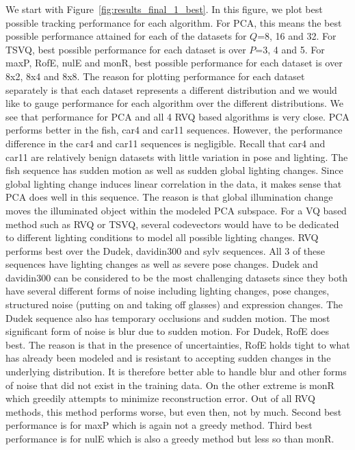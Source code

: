 We start with Figure~\ref{fig:results_final_1_best}.  In this figure, we plot best possible tracking performance for each algorithm.  For PCA, this means the best possible performance attained for each of the datasets for $Q$=8, 16 and 32.  For TSVQ, best possible performance for each dataset is over $P$=3, 4 and 5.  For maxP, RofE, nulE and monR, best possible performance for each dataset is over 8x2, 8x4 and 8x8.  The reason for plotting performance for each dataset separately is that each dataset represents a different distribution and we would like to gauge performance for each algorithm over the different distributions.  We see that performance for PCA and all 4 RVQ based algorithms is very close.  PCA performs better in the fish, car4 and car11 sequences.  However, the performance difference in the car4 and car11 sequences is negligible.  Recall that car4 and car11 are relatively benign datasets with little variation in pose and lighting.  The fish sequence has sudden motion as well as sudden global lighting changes.   Since global lighting change induces linear correlation in the data, it makes sense that PCA does well in this sequence.  The reason is that global illumination change moves the illuminated object within the modeled PCA subspace.  For a VQ based method such as RVQ or TSVQ, several codevectors would have to be dedicated to different lighting conditions to model all possible lighting changes.  RVQ performs best over the Dudek, davidin300 and sylv sequences.  All 3 of these sequences have lighting changes as well as severe pose changes.  Dudek and davidin300 can be considered to be the most challenging datasets since they both have several different forms of noise including lighting changes, pose changes, structured noise (putting on and taking off glasses) and expression changes.  The Dudek sequence also has temporary occlusions and sudden motion.  The most significant form of noise is blur due to sudden motion.  For Dudek, RofE does best.  The reason is that in the presence of uncertainties, RofE holds tight to what has already been modeled and is resistant to accepting sudden changes in the underlying distribution.  It is therefore better able to handle blur and other forms of noise that did not exist in the training data.  On the other extreme is monR which greedily attempts to minimize reconstruction error.  Out of all RVQ methods, this method performs worse, but even then, not by much.  Second best performance is for maxP which is again not a greedy method.  Third best performance is for nulE which is also a greedy method but less so than monR.


